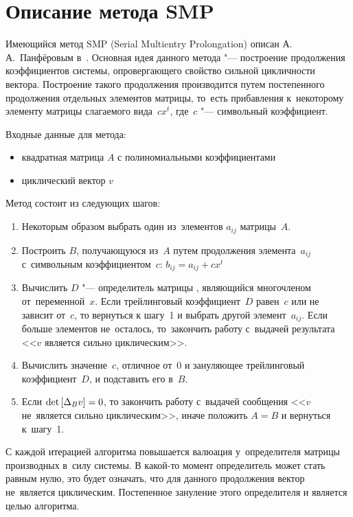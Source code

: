 \section{Описание метода SMP}

Имеющийся метод SMP (Serial Multientry Prolongation) описан А.\,А.~Панфёровым в~\cite{litPanferov}.
Основная идея данного метода "--- построение продолжения коэффициентов системы,
опровергающего свойство сильной цикличности вектора.
Построение такого продолжения производится путем постепенного продолжения отдельных элементов матрицы,
то~есть прибавления к~некоторому элементу матрицы слагаемого вида~$cx^t$, где~$c$ "--- символьный коэффициент.

Входные данные для метода:
\begin{itemize}
    \item
        квадратная матрица $A$ с полиномиальными коэффициентами
    \item
        циклический вектор $v$
\end{itemize}

Метод состоит из следующих шагов:
\begin{enumerate}
    \item
        Некоторым образом выбрать один из~элементов $a_{ij}$ матрицы~$A$.
    \item
        Построить $B$, получающуюся из~$A$ путем продолжения элемента~$a_{ij}$ с~символьным коэффициентом~$c$:
        $b_{ij} = a_{ij} + cx^t$
    \item
        Вычислить $D$ "--- определитель матрицы \diffMatrix[B], являющийся многочленом от~переменной~$x$.
        Если трейлинговый коэффициент~$D$ равен~$c$ или не зависит от~$c$, то вернуться к шагу~1 и выбрать другой элемент~$a_{ij}$.
        Если больше элементов не~осталось, то~закончить работу с~выдачей результата <<$v$ является сильно циклическим>>.
    \item
        Вычислить значение~$c$, отличное от~0 и зануляющее трейлинговый коэффициент~$D$, и подставить его в~$B$.
    \item
        Если $\mathop{\rm det}\text{$ [\Delta_B v] $} = 0$, то закончить работу с~выдачей сообщения <<$v$ не~является сильно циклическим>>,
        иначе положить $A = B$ и вернуться к~шагу~1.
\end{enumerate}

С каждой итерацией алгоритма повышается валюация у~определителя матрицы производных в~силу системы.
В какой-то момент определитель может стать равным нулю, это будет означать,
что для данного продолжения вектор не~является циклическим.
Постепенное зануление этого определителя и является целью алгоритма.

